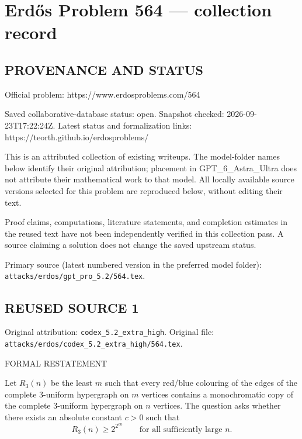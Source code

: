 \section*{Erd\H{o}s Problem 564 --- collection record}

\subsection*{PROVENANCE AND STATUS}
Official problem: https://www.erdosproblems.com/564

Saved collaborative-database status: open.
Snapshot checked: 2026-09-23T17:22:24Z.
Latest status and formalization links: https://teorth.github.io/erdosproblems/

This is an attributed collection of existing writeups. The model-folder names below identify their original attribution; placement in GPT\_6\_Astra\_Ultra does not attribute their mathematical work to that model. All locally available source versions selected for this problem are reproduced below, without editing their text.

Proof claims, computations, literature statements, and completion estimates in the reused text have not been independently verified in this collection pass. A source claiming a solution does not change the saved upstream status.

Primary source (latest numbered version in the preferred model folder): \texttt{attacks/erdos/gpt\_pro\_5.2/564.tex}.

\subsection*{REUSED SOURCE 1}
Original attribution: \texttt{codex\_5.2\_extra\_high}.
Original file: \texttt{attacks/erdos/codex\_5.2\_extra\_high/564.tex}.

FORMAL RESTATEMENT

Let $R_3(n)$ be the least $m$ such that every red/blue colouring of the edges of the complete $3$-uniform hypergraph on $m$ vertices contains a monochromatic copy of the complete $3$-uniform hypergraph on $n$ vertices.
The question asks whether there exists an absolute constant $c>0$ such that
\[
R_3(n) \ge 2^{2^{c n}} \qquad\text{for all sufficiently large }n.
\]

